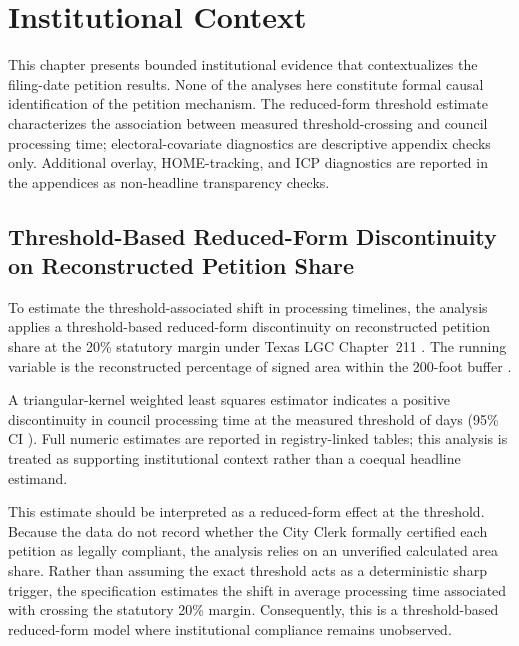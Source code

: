 \documentclass[11pt, letterpaper, oneside]{article}
\begin{document}


\section{Institutional Context}
\label{sec:institutional_context}

This chapter presents bounded institutional evidence that contextualizes the filing-date petition results. None of the analyses here constitute formal causal identification of the petition mechanism. The reduced-form threshold estimate characterizes the association between measured threshold-crossing and council processing time; electoral-covariate diagnostics are descriptive appendix checks only. Additional overlay, HOME-tracking, and ICP diagnostics are reported in the appendices as non-headline transparency checks.

\subsection{Threshold-Based Reduced-Form Discontinuity on Reconstructed Petition Share}

To estimate the threshold-associated shift in processing timelines, the analysis applies a threshold-based reduced-form discontinuity on reconstructed petition share at the 20\% statutory margin under Texas LGC Chapter~211 \cite{texas211006}. The running variable is the reconstructed percentage of signed area within the 200-foot buffer \cite{lee2010rd}.

A triangular-kernel weighted least squares estimator indicates a positive discontinuity in council processing time at the measured threshold of \metricRDDelay{} days (95\% CI \metricRDCI{}). Full numeric estimates are reported in registry-linked tables; this analysis is treated as supporting institutional context rather than a coequal headline estimand.

This estimate should be interpreted as a reduced-form effect at the threshold. Because the data do not record whether the City Clerk formally certified each petition as legally compliant, the analysis relies on an unverified calculated area share. Rather than assuming the exact threshold acts as a deterministic sharp trigger, the specification estimates the shift in average processing time associated with crossing the statutory 20\% margin. Consequently, this is a threshold-based reduced-form model where institutional compliance remains unobserved.
\end{document}
